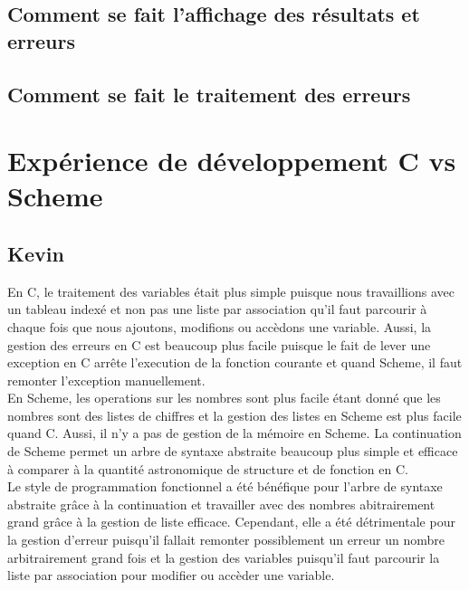 \documentclass[a4paper,12pt,french]{article}
\begin{document}
	\subsection{Comment se fait l'affichage des résultats et erreurs}
	\subsection{Comment se fait le traitement des erreurs}
	\newpage
	\section{Expérience de développement C vs Scheme}
	\subsection{Kevin}
	En C, le traitement des variables était plus simple puisque nous travaillions avec un tableau indexé et non pas une liste par association qu'il faut parcourir à chaque fois que nous ajoutons, modifions ou accèdons une variable. Aussi, la gestion des erreurs en C est beaucoup plus facile puisque le fait de lever une exception en C arrête l'execution de la fonction courante et quand Scheme, il faut remonter l'exception manuellement.\\
	
	En Scheme, les operations sur les nombres sont plus facile étant donné que les nombres sont des listes de chiffres et la gestion des listes en Scheme est plus facile quand C. Aussi, il n'y a pas de gestion de la mémoire en Scheme. La continuation de Scheme permet un arbre de syntaxe abstraite beaucoup plus simple et efficace à comparer à la quantité astronomique de structure et de fonction en C.\\
	
	Le style de programmation fonctionnel a été bénéfique pour l'arbre de syntaxe abstraite grâce à la continuation et travailler avec des nombres abitrairement grand grâce à la gestion de liste efficace. Cependant, elle a été détrimentale pour la gestion d'erreur puisqu'il fallait remonter possiblement un erreur un nombre arbitrairement grand fois et la gestion des variables puisqu'il faut parcourir la liste par association pour modifier ou accèder une variable.\\
\end{document}
